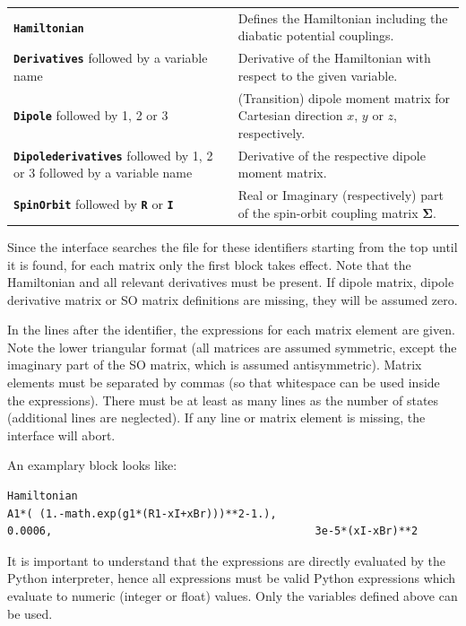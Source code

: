 \documentclass[a4paper,10pt,DIV=15,openany]{scrbook}
\newcommand{\ttt}[1]{\textbf{\texttt{#1}}}
\newenvironment{example}{
  \setlength{\OuterFrameSep}{3pt}
  \vspace{0mm}
  \definecolor{shadecolor}{HTML}{E4F4FF}
  \begin{shaded}
}{
  \end{shaded}
}
\begin{document}
\begin{tabular}{p{5cm}p{9cm}}
\ttt{Hamiltonian}                               &Defines the Hamiltonian including the diabatic potential couplings.\\
\ttt{Derivatives} followed by a variable name   &Derivative of the Hamiltonian with respect to the given variable.\\
\ttt{Dipole} followed by 1, 2 or 3              &(Transition) dipole moment matrix for Cartesian direction $x$, $y$ or $z$, respectively.\\
\ttt{Dipolederivatives} followed by 1, 2 or 3 followed by a variable name       &Derivative of the respective dipole moment matrix.\\
\ttt{SpinOrbit} followed by \ttt{R} or \ttt{I}  &Real or Imaginary (respectively) part of the spin-orbit coupling matrix $\boldsymbol{\Sigma}$.\\
\end{tabular}

Since the interface searches the file for these identifiers starting from the top until it is found, for each matrix only the first block takes effect. Note that the Hamiltonian and all relevant derivatives must be present. If dipole matrix, dipole derivative matrix or SO matrix definitions are missing, they will be assumed zero.

In the lines after the identifier, the expressions for each matrix element are given. Note the lower triangular format (all matrices are assumed symmetric, except the imaginary part of the SO matrix, which is assumed antisymmetric). Matrix elements must be separated by commas (so that whitespace can be used inside the expressions). There must be at least as many lines as the number of states (additional lines are neglected). If any line or matrix element is missing, the interface will abort.

An examplary block looks like:
\begin{example}
  \begin{verbatim}
Hamiltonian
A1*( (1.-math.exp(g1*(R1-xI+xBr)))**2-1.),
0.0006,                                         3e-5*(xI-xBr)**2
\end{verbatim}
\end{example}
It is important to understand that the expressions are directly evaluated by the Python interpreter, hence all expressions must be valid Python expressions which evaluate to numeric (integer or float) values. Only the variables defined above can be used. 
\end{document}
